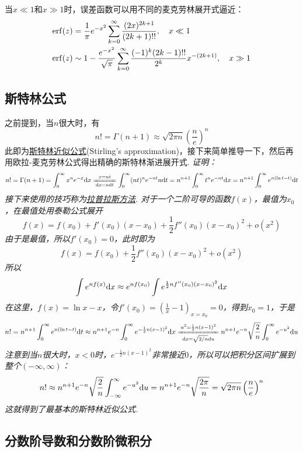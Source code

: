 \documentclass[main.tex]{subfiles}
\begin{document}
当\(x\ll1\)和\(x\gg1\)时，误差函数可以用不同的麦克劳林展开式逼近：
\begin{align*}
    {\rm erf}(z) &= \frac{1}{\pi}e^{-x^2} \sum_{k=0}^{\infty} \frac{(2x)^{2k+1}}{(2k+1)!!}, \quad x \ll 1 \\
    {\rm erf}(z) &\sim 1-\frac{e^{-x^2}}{\sqrt{\pi}}\sum_{k=0}^{\infty}\frac{(-1)^k(2k-1)!!}{2^k}x^{-(2k+1)}, \quad x \gg 1
\end{align*}

\subsection{斯特林公式}

之前提到，当\(n\)很大时，有
\[n! = \Gamma(n+1) \approx \sqrt{2\pi n}\left(\frac{n}{e}\right)^n\]
此即为\uline{斯特林近似公式}(Stirling's approximation)，接下来简单推导一下，然后再用欧拉-麦克劳林公式得出精确的斯特林渐进展开式.
\newline
\textit{证明：}
\[ n! = \Gamma(n+1) = \int_{0}^{\infty}x^{n}e^{-x}\trm{d}x \xlongequal[\trm{d}x=n\trm{d}t]{x = nt} \int_{0}^{\infty}(nt)^{n}e^{-nt}n\trm{d}t = n^{n+1}\int_{0}^{\infty}t^{n}e^{-nt}\trm{d}x = n^{n+1}\int_{0}^{\infty}e^{n(\ln t - t)}\trm{d}t\]
\textit{接下来使用的技巧称为\uline{拉普拉斯方法}. 对于一个二阶可导的函数\(f(x)\)，最值为\(x_0\)，在最值处用泰勒公式展开}
\[f(x) = f(x_0)+f'(x_0)(x-x_0)+\frac{1}{2}f''(x_0)(x-x_0)^2+o(x^2)\]
\textit{由于是最值，所以\(f'(x_0)=0\)，此时即为}
\[f(x) = f(x_0)+\frac{1}{2}f''(x_0)(x-x_0)^2+o(x^2)\]
\textit{所以}
\[\int e^{nf(x)}{\rm d}x \approx e^{nf(x_0)}\int e^{\frac{1}{2}nf''(x_0)(x-x_0)^2}{\rm d}x\]
\textit{在这里，\(f(x)=\ln x-x\)，令\(\displaystyle{f'(x_0)=\left(\frac{1}{x}-1\right)_{x=x_0}=0}\)，得到\(x_0=1\)，于是}
\[n! = n^{n+1}\int_{0}^{\infty}e^{n(\ln t - t)}\trm{d}t \approx n^{n+1}e^{-n}\int_{0}^{\infty}e^{-\frac{1}{2}n(x-1)^2}\trm{d}x \xlongequal[\trm{d}x=\sqrt{2/n}\trm{d}u]{u^2=\frac{1}{2}n(x-1)^2} n^{n+1}e^{-n}\sqrt{\frac{2}{n}}\int_{0}^{\infty}e^{-u^2}\trm{d}u\]
\textit{注意到当\(n\)很大时，\(x<0\)时，\(e^{-\frac{1}{2}n(x-1)^2}\)非常接近\(0\)，所以可以把积分区间扩展到整个\((-\infty, \infty)\)：}
\[n! \approx n^{n+1}e^{-n}\sqrt{\frac{2}{n}}\int_{-\infty}^{\infty}e^{-u^2}{\rm d}u = n^{n+1}e^{-n}\sqrt{\frac{2\pi}{n}} = \sqrt{2\pi n}\left(\frac{n}{e}\right)^n\]
\textit{这就得到了最基本的斯特林近似公式.}

\subsection{分数阶导数和分数阶微积分}
\end{document}
